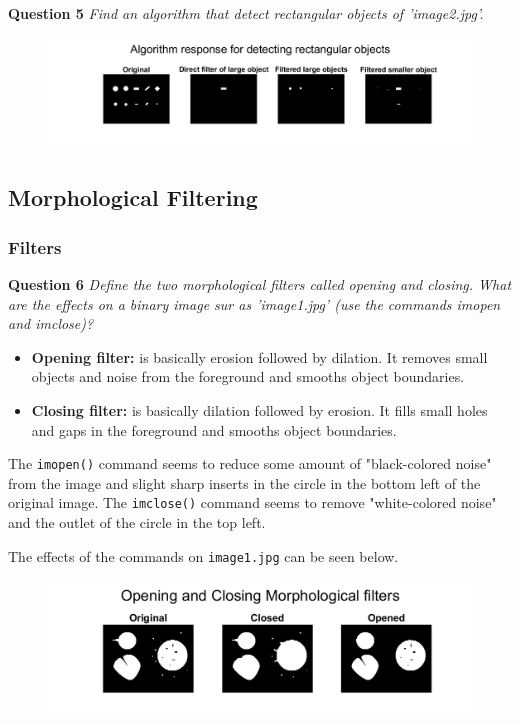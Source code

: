 \textbf{Question 5} \textit{Find an algorithm that detect rectangular objects of ’image2.jpg’.}

\begin{figure}[H]
    \centering
    \includegraphics[width=\linewidth]{Doc/Graphics/Part2/Part2_Q5.png}
\end{figure}


\subsection{Morphological Filtering}
\subsubsection{Filters}
\textbf{Question 6} \textit{Deﬁne the two morphological ﬁlters called opening and closing. What are the eﬀects on a binary image sur as ’image1.jpg’ (use the commands imopen and imclose)?}

\begin{itemize}
    \item \textbf{Opening filter:} is basically erosion followed by dilation. It removes small objects and noise from the foreground and smooths object boundaries.

    \item  \textbf{Closing filter:} is basically dilation followed by erosion. It fills small holes and gaps in the foreground and smooths object boundaries.    
\end{itemize}


The \texttt{imopen()} command seems to reduce some amount of "black-colored noise" from the image and slight sharp inserts in the circle in the bottom left of the original image. The \texttt{imclose()} command seems to remove "white-colored noise" and the outlet of the circle in the top left.

The effects of the commands on \texttt{image1.jpg} can be seen below.

\begin{figure}[H]
    \centering
    \includegraphics[width=0.75\linewidth]{Doc/Graphics/Part2/part2_Q6.png}
\end{figure}


